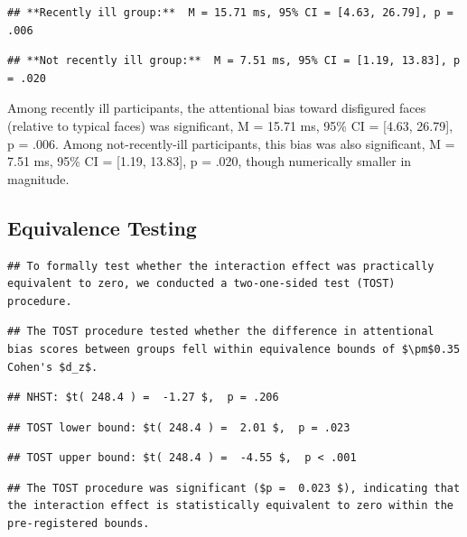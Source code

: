 \documentclass[
  english,
  man]{apa6}
\begin{document}
\begin{verbatim}
## **Recently ill group:**  M = 15.71 ms, 95% CI = [4.63, 26.79], p = .006
\end{verbatim}

\begin{verbatim}
## **Not recently ill group:**  M = 7.51 ms, 95% CI = [1.19, 13.83], p = .020
\end{verbatim}

Among recently ill participants, the attentional bias toward disfigured faces (relative to typical faces) was significant, M = 15.71 ms, 95\% CI = {[}4.63, 26.79{]}, p = .006.
Among not-recently-ill participants, this bias was also significant, M = 7.51 ms, 95\% CI = {[}1.19, 13.83{]}, p = .020,
though numerically smaller in magnitude.

\subsection{Equivalence Testing}\label{equivalence-testing}

\begin{verbatim}
## To formally test whether the interaction effect was practically equivalent to zero, we conducted a two-one-sided test (TOST) procedure.
\end{verbatim}

\begin{verbatim}
## The TOST procedure tested whether the difference in attentional bias scores between groups fell within equivalence bounds of $\pm$0.35 Cohen's $d_z$.
\end{verbatim}

\begin{verbatim}
## NHST: $t( 248.4 ) =  -1.27 $,  p = .206
\end{verbatim}

\begin{verbatim}
## TOST lower bound: $t( 248.4 ) =  2.01 $,  p = .023
\end{verbatim}

\begin{verbatim}
## TOST upper bound: $t( 248.4 ) =  -4.55 $,  p < .001
\end{verbatim}

\begin{verbatim}
## The TOST procedure was significant ($p =  0.023 $), indicating that the interaction effect is statistically equivalent to zero within the pre-registered bounds.
\end{verbatim}
\end{document}
